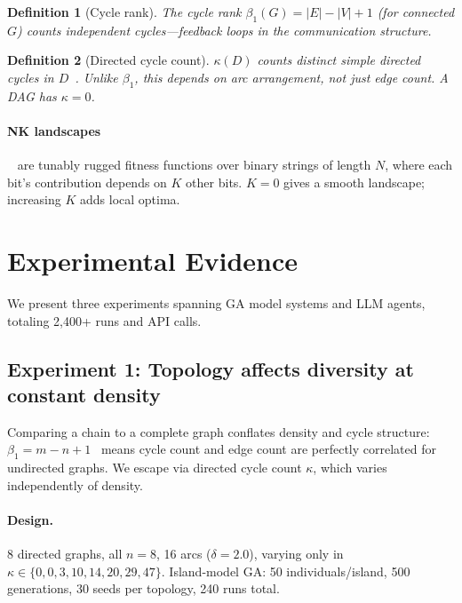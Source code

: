 \documentclass[10pt,twocolumn]{article}
\newtheorem{definition}{Definition}
\begin{document}
\begin{definition}[Cycle rank]
The \emph{cycle rank} $\beta_1(G) = |E| - |V| + 1$ (for connected
$G$) counts independent cycles---feedback loops in the communication
structure.
\end{definition}

\begin{definition}[Directed cycle count]
$\kappa(D)$ counts distinct simple directed cycles in
$D$~\citep{johnson1975finding}. Unlike $\beta_1$, this depends on arc
\emph{arrangement}, not just edge count. A DAG has $\kappa = 0$.
\end{definition}

\paragraph{NK landscapes}~\citep{kauffman1993origins} are tunably
rugged fitness functions over binary strings of length $N$, where each
bit's contribution depends on $K$ other bits. $K{=}0$ gives a smooth
landscape; increasing $K$ adds local optima.

\section{Experimental Evidence}
\label{sec:experiments}

We present three experiments spanning GA model systems and LLM agents,
totaling 2,400+ runs and API calls.

\subsection{Experiment 1: Topology affects diversity at constant density}

Comparing a chain to a complete graph conflates density and cycle
structure: $\beta_1 = m - n + 1$~\citep{hatcher2002algebraic} means
cycle count and edge count are perfectly correlated for undirected
graphs. We escape via directed cycle count $\kappa$, which varies
independently of density.

\paragraph{Design.}
8 directed graphs, all $n{=}8$, 16 arcs ($\delta{=}2.0$), varying
only in $\kappa \in \{0, 0, 3, 10, 14, 20, 29, 47\}$.
Island-model GA: 50 individuals/island, 500 generations, 30 seeds
per topology, 240 runs total.
\end{document}

